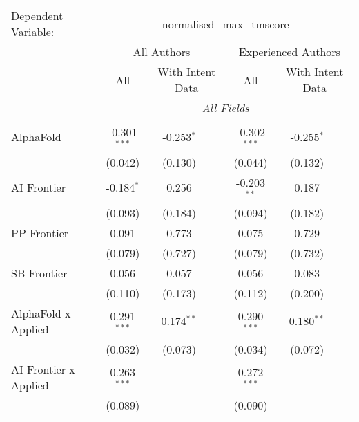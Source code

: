 \begingroup
\centering
\begin{tabular}{lcccccc}
   \tabularnewline \midrule \midrule
   Dependent Variable: & \multicolumn{6}{c}{normalised\_max\_tmscore}\\
 & \multicolumn{3}{c}{All Authors} & \multicolumn{3}{c}{Experienced Authors} \\
\cmidrule(lr){2-4} \cmidrule(lr){5-7}
 & \multicolumn{1}{c}{All} & \multicolumn{2}{c}{With Intent Data} & \multicolumn{1}{c}{All} & \multicolumn{2}{c}{With Intent Data} \\
\cmidrule(lr){2-2} \cmidrule(lr){3-4} \cmidrule(lr){5-5} \cmidrule(lr){6-7}
 & \multicolumn{6}{c}{\textit{All Fields}} \\ \\
   AlphaFold                      & -0.301$^{***}$ & -0.253$^{*}$ &               & -0.302$^{***}$ & -0.255$^{*}$ &   \\   
                                  & (0.042)        & (0.130)      &               & (0.044)        & (0.132)      &   \\   
   AI Frontier                    & -0.184$^{*}$   & 0.256        &               & -0.203$^{**}$  & 0.187        &   \\   
                                  & (0.093)        & (0.184)      &               & (0.094)        & (0.182)      &   \\   
   PP Frontier                    & 0.091          & 0.773        &               & 0.075          & 0.729        &   \\   
                                  & (0.079)        & (0.727)      &               & (0.079)        & (0.732)      &   \\   
   SB Frontier                    & 0.056          & 0.057        &               & 0.056          & 0.083        &   \\   
                                  & (0.110)        & (0.173)      &               & (0.112)        & (0.200)      &   \\   
   AlphaFold x Applied            & 0.291$^{***}$  & 0.174$^{**}$ &               & 0.290$^{***}$  & 0.180$^{**}$ &   \\   
                                  & (0.032)        & (0.073)      &               & (0.034)        & (0.072)      &   \\   
   AI Frontier x Applied          & 0.263$^{***}$  &              &               & 0.272$^{***}$  &              &   \\   
                                  & (0.089)        &              &               & (0.090)        &              &   \\   

\end{tabular}
